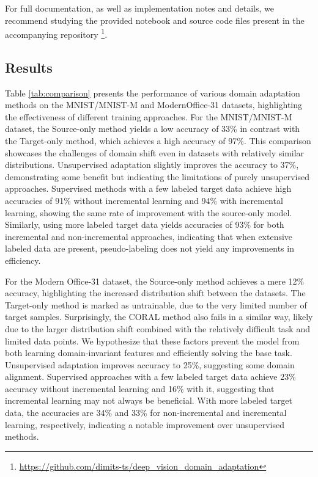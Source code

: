 \documentclass[12pt, a4paper]{article}
\begin{document}
	For full documentation, as well as implementation notes and details, we recommend studying the provided notebook and source code files present in the accompanying repository \footnote{\url{https://github.com/dimits-ts/deep\_vision\_domain\_adaptation}}.
	
	
	\subsection{Results}
	
	Table \ref{tab:comparison} presents the performance of various domain adaptation methods on the MNIST/MNIST-M and ModernOffice-31 datasets, highlighting the effectiveness of different training approaches. For the MNIST/MNIST-M dataset, the Source-only method yields a low accuracy of 33\% in contrast with the Target-only method, which achieves a high accuracy of 97\%. This comparison showcases the challenges of domain shift even in datasets with relatively similar distributions. Unsupervised adaptation slightly improves the accuracy to 37\%, demonstrating some benefit but indicating the limitations of purely unsupervised approaches. Supervised methods with a few labeled target data achieve high accuracies of 91\% without incremental learning and 94\% with incremental learning, showing the same rate of improvement with the source-only model. Similarly, using more labeled target data yields accuracies of 93\% for both incremental and non-incremental approaches, indicating that when extensive labeled data are present, pseudo-labeling does not yield any improvements in efficiency.
	
	For the Modern Office-31 dataset, the Source-only method achieves a mere 12\% accuracy, highlighting the increased distribution shift between the datasets. The Target-only method is marked as untrainable, due to the very limited number of target samples. Surprisingly, the CORAL method also fails in a similar way, likely due to the larger distribution shift combined with the relatively difficult task and limited data points. We hypothesize that these factors prevent the model from both learning domain-invariant features and efficiently solving the base task. Unsupervised adaptation improves accuracy to 25\%, suggesting some domain alignment. Supervised approaches with a few labeled target data achieve 23\% accuracy without incremental learning and 16\% with it, suggesting that incremental learning may not always be beneficial. With more labeled target data, the accuracies are 34\% and 33\% for non-incremental and incremental learning, respectively, indicating a notable improvement over unsupervised methods. 
	
\end{document}
